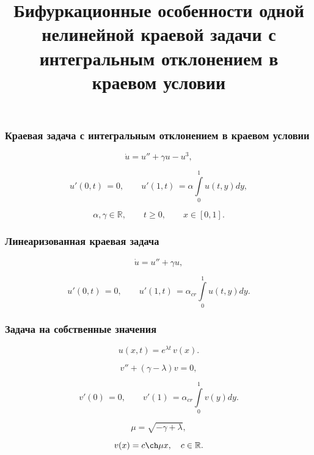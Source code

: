 \documentclass[fullscreen=true, unicode, bookmarks=false]{beamer}
\title[]{ {\huge Бифуркационные особенности одной нелинейной краевой задачи с интегральным отклонением в краевом условии } }
\date{ }
\begin{document}
\begin{frame}
\titlepage
\end{frame} 

\begin{frame}
\frametitle{ Краевая задача с интегральным отклонением в краевом условии }
 
\begin{equation}
	\dot u = u'' + \gamma u - u^3,	
\end{equation}

\begin{equation}
	u'(0, t) \, = 0, \qquad u'(1, t) \, = \alpha \int\limits_{0}^{1} u(t, y) dy,
\end{equation}

\bigskip

$$ \alpha, \gamma \in \mathbb{R}, \qquad t \geqslant 0, \qquad x \in [0,1]. $$

\end{frame}

\begin{frame}
\frametitle{ Линеаризованная краевая задача }
 
\begin{equation}
	\dot u = u'' + \gamma u,	
\end{equation}

\begin{equation}	
	u'(0, t) \, = 0, \qquad u'(1, t) \, = \alpha_{cr}\int\limits_{0}^{1} u(t, y) dy.
\end{equation}

\end{frame}

\begin{frame}
\frametitle{ Задача на собственные значения }
 
$$ u(x, t) = e^{\lambda t} \, v(x). $$

\bigskip
 
\begin{equation}
	v'' + (\gamma - \lambda)v = 0,	
\end{equation}

\begin{equation}	
	v'(0) \, = 0, \qquad v'(1) \, = \alpha_{cr}\int\limits_{0}^{1} v(y) dy.
\end{equation}

\bigskip

$$ \mu = \sqrt{-\gamma + \lambda}, $$

$$ v(x) = c \ch  \mu x, \quad c \in \mathbb{R}. $$

\end{frame}
\end{document}
